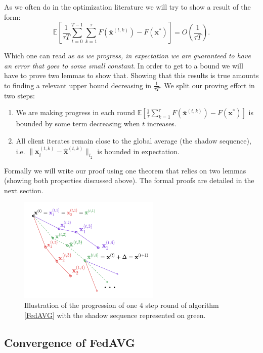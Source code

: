 As we often do in the optimization literature we will try to show a result of the form: 
\[ \mathbb{E}\left[ \frac{1}{\tau T} \sum_{t=0}^{T-1} \sum_{k=1}^{\tau} F(\bar{\bm{x}}^{(t,k)}) -F(\bm{x}^*) \right] = O\left( \frac{1}{\tau T} \right). \]

Which one can read as \textit{as we progress, in expectation we are guaranteed to have an error that goes to some small constant}. In order to get to a bound we will have to prove two lemmas to show that. Showing that this results is true amounts to finding a relevant upper bound decreasing in $\frac{1}{\tau T}$. We split our proving effort in two steps:


\begin{enumerate}
    \item We are making progress in each round $\mathbb{E}\left[ \frac{1}{\tau} \sum^{\tau}_{k=1} F(\bar{\bm{x}}^{(t,k)}) - F(\bm{x}^*) \right]$ is bounded by some term decreasing when $t$ increases.
    \item All client iterates remain close to the global average (the shadow sequence), i.e. $\| \bm{x}_i^{(t,k)} - \hat{\bm{x}}^{(t,k)}  \|_{l_2}$ is bounded in expectation.
\end{enumerate}

Formally we will write our proof using one theorem that relies on two lemmas (showing both properties discussed above). The formal proofs are detailed in the next section.

\begin{figure}[h!]
    \centering
    \includegraphics[width=0.6\textwidth]{figures/FedAVG_traj.pdf}
    \caption{Illustration of the progression of one $4$ step round of algorithm \ref{FedAVG} with the shadow sequence represented on green.}
\end{figure}

\subsection{Convergence of FedAVG}

